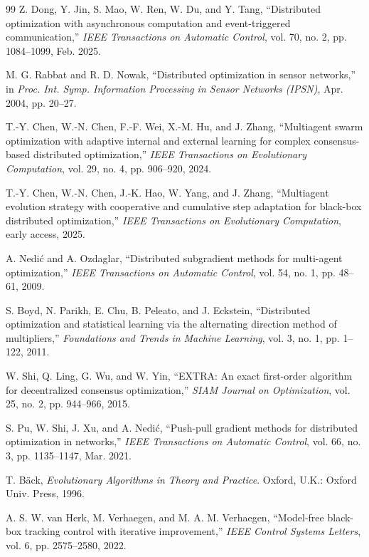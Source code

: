 \documentclass[conference]{IEEEtran}
\begin{document}
\begin{thebibliography}{99}
 Z. Dong, Y. Jin, S. Mao, W. Ren, W. Du, and Y. Tang, ``Distributed optimization with asynchronous computation and event-triggered communication,'' \emph{IEEE Transactions on Automatic Control}, vol. 70, no. 2, pp. 1084--1099, Feb. 2025.

 M. G. Rabbat and R. D. Nowak, ``Distributed optimization in sensor networks,'' in \emph{Proc. Int. Symp. Information Processing in Sensor Networks (IPSN)}, Apr. 2004, pp. 20--27.

 T.-Y. Chen, W.-N. Chen, F.-F. Wei, X.-M. Hu, and J. Zhang, ``Multiagent swarm optimization with adaptive internal and external learning for complex consensus-based distributed optimization,'' \emph{IEEE Transactions on Evolutionary Computation}, vol. 29, no. 4, pp. 906--920, 2024.

 T.-Y. Chen, W.-N. Chen, J.-K. Hao, W. Yang, and J. Zhang, ``Multiagent evolution strategy with cooperative and cumulative step adaptation for black-box distributed optimization,'' \emph{IEEE Transactions on Evolutionary Computation}, early access, 2025.

 A. Nedi\'c and A. Ozdaglar, ``Distributed subgradient methods for multi-agent optimization,'' \emph{IEEE Transactions on Automatic Control}, vol. 54, no. 1, pp. 48--61, 2009.

 S. Boyd, N. Parikh, E. Chu, B. Peleato, and J. Eckstein, ``Distributed optimization and statistical learning via the alternating direction method of multipliers,'' \emph{Foundations and Trends in Machine Learning}, vol. 3, no. 1, pp. 1--122, 2011.

 W. Shi, Q. Ling, G. Wu, and W. Yin, ``EXTRA: An exact first-order algorithm for decentralized consensus optimization,'' \emph{SIAM Journal on Optimization}, vol. 25, no. 2, pp. 944--966, 2015.

 S. Pu, W. Shi, J. Xu, and A. Nedi\'c, ``Push-pull gradient methods for distributed optimization in networks,'' \emph{IEEE Transactions on Automatic Control}, vol. 66, no. 3, pp. 1135--1147, Mar. 2021.

 T. B\"ack, \emph{Evolutionary Algorithms in Theory and Practice}. Oxford, U.K.: Oxford Univ. Press, 1996.

 A. S. W. van Herk, M. Verhaegen, and M. A. M. Verhaegen, ``Model-free black-box tracking control with iterative improvement,'' \emph{IEEE Control Systems Letters}, vol. 6, pp. 2575--2580, 2022.


\end{thebibliography}
\end{document}
